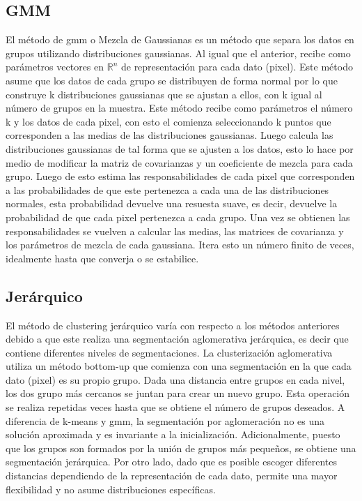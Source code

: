 \documentclass[10pt,twocolumn,letterpaper]{article}
\begin{document}
\subsection{GMM}
El método de gmm o Mezcla de Gaussianas es un método que separa los datos en grupos utilizando distribuciones gaussianas. Al igual que el anterior, recibe como parámetros vectores en $\mathds{R}^n$ de representación para cada dato (pixel). Este método asume que los datos de cada grupo se distribuyen de forma normal por lo que construye k distribuciones gaussianas que se ajustan a ellos, con k igual al número de grupos en la muestra. Este método recibe como parámetros el número k y los datos de cada pixel, con esto el comienza seleccionando k puntos que corresponden a las medias de las distribuciones gaussianas. Luego calcula las distribuciones gaussianas de tal forma que se ajusten a los datos, esto lo hace por medio de modificar la matriz de covarianzas y un coeficiente de mezcla para cada grupo. Luego de esto estima las responsabilidades de cada pixel que corresponden a las probabilidades de que este pertenezca a cada una de las distribuciones normales, esta probabilidad devuelve una resuesta suave, es decir, devuelve la probabilidad de que cada pixel pertenezca a cada grupo. Una vez se obtienen las responsabilidades se vuelven a calcular las medias, las matrices de covarianza y los parámetros de mezcla de cada gaussiana. Itera esto un número finito de veces, idealmente hasta que converja o se estabilice. 

\subsection{Jerárquico}
El método de clustering jerárquico varía con respecto a los métodos anteriores debido a que este realiza una segmentación aglomerativa jerárquica, es decir  que contiene diferentes niveles de segmentaciones. La clusterización aglomerativa utiliza un método bottom-up que comienza con una segmentación en la que cada dato (pixel) es su propio grupo. Dada una distancia entre grupos en cada nivel, los dos grupo más cercanos se juntan para crear un nuevo grupo. Esta operación se realiza repetidas veces hasta que se obtiene el número de grupos deseados. A diferencia de k-means y gmm, la segmentación por aglomeración no es una solución aproximada y es invariante a la inicialización. Adicionalmente, puesto que los grupos son formados por la unión de grupos más pequeños, se obtiene una segmentación jerárquica. Por otro lado, dado que es posible escoger diferentes distancias dependiendo de la representación de cada dato, permite una mayor flexibilidad y no asume distribuciones específicas. 
\end{document}
